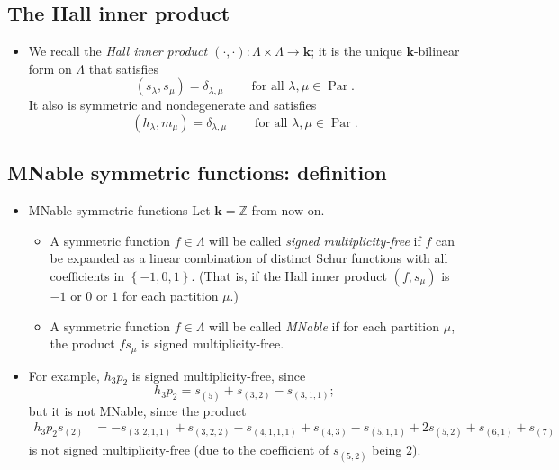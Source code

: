 \documentclass[numbers=enddot,12pt,final,onecolumn,notitlepage]{scrartcl}%
\newcommand{\defn}[1]{{\color{darkred}\emph{#1}}}
\newcommand{\0}{\phantom{c}}
\newcommand{\nowbox}{\hphantom{x} \vspace{-1.5pc}}
\begin{document}
\subsection{The Hall inner product}

\begin{itemize}
\item We recall the \defn{Hall inner product $\left(  \cdot,\cdot\right)
:\Lambda\times\Lambda\rightarrow\mathbf{k}$}; it is the unique $\mathbf{k}%
$-bilinear form on $\Lambda$ that satisfies
\[
\left(  s_{\lambda},s_{\mu}\right)  =\delta_{\lambda,\mu}%
\ \ \ \ \ \ \ \ \ \ \text{for all }\lambda,\mu\in\operatorname*{Par}.
\]
It also is symmetric and nondegenerate and satisfies%
\[
\left(  h_{\lambda},m_{\mu}\right)  =\delta_{\lambda,\mu}%
\ \ \ \ \ \ \ \ \ \ \text{for all }\lambda,\mu\in\operatorname*{Par}.
\]

\end{itemize}

\subsection{MNable symmetric functions: definition}

\begin{itemize}
\item \nowbox
\begin{definition}{MNable symmetric functions}{}
Let $\mathbf{k}=\mathbb{Z}$ from now on.

\begin{itemize}
\item A symmetric function $f\in\Lambda$ will be called \defn{signed
multiplicity-free} if $f$ can be expanded as a linear combination of distinct
Schur functions with all coefficients in $\left\{  -1,0,1\right\}  $. (That
is, if the Hall inner product $\left(  f,s_{\mu}\right)  $ is $-1$ or $0$ or
$1$ for each partition $\mu$.)

\item A symmetric function $f\in\Lambda$ will be called \defn{MNable} if for
each partition $\mu$, the product $fs_{\mu}$ is signed multiplicity-free.
\end{itemize}
\end{definition}

\item For example, $h_{3}p_{2}$ is signed multiplicity-free, since
\[
h_{3}p_{2}=s_{\left(  5\right)  }+s_{\left(  3,2\right)  }-s_{\left(
3,1,1\right)  };
\]
but it is not MNable, since the product
\begin{align*}
h_{3}p_{2}s_{\left(  2\right)  }  &  =-s_{\left(  3,2,1,1\right)  }+s_{\left(
3,2,2\right)  }-s_{\left(  4,1,1,1\right)  }+s_{\left(  4,3\right)  }
-s_{\left(  5,1,1\right)  }+2s_{\left(  5,2\right)
}+s_{\left(  6,1\right)  }+s_{\left(  7\right)  }%
\end{align*}
is not signed multiplicity-free (due to the coefficient of $s_{\left(
5,2\right)  }$ being $2$).
\end{itemize}
\end{document}
